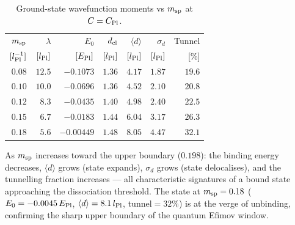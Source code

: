 \begin{table}[h]
\centering
\caption{Ground-state wavefunction moments vs $m_{\rm sp}$ at $C=C_{\rm Pl}$.}
\label{tab:psi0_vs_msp_moments}
\begin{tabular}{rrrrrrr}
\hline
$m_{\rm sp}$ & $\lambda$ & $E_0$ & $d_{\rm cl}$ & $\langle d\rangle$ &
$\sigma_d$ & Tunnel \\
$[l_{\rm Pl}^{-1}]$ & $[l_{\rm Pl}]$ & $[E_{\rm Pl}]$ & $[l_{\rm Pl}]$ &
$[l_{\rm Pl}]$ & $[l_{\rm Pl}]$ & [\%] \\
\hline
$0.08$ & $12.5$ & $-0.1073$ & $1.36$ & $4.17$ & $1.87$ & $19.6$ \\
$0.10$ & $10.0$ & $-0.0696$ & $1.36$ & $4.52$ & $2.10$ & $20.8$ \\
$0.12$ & $\;\;8.3$ & $-0.0435$ & $1.40$ & $4.98$ & $2.40$ & $22.5$ \\
$0.15$ & $\;\;6.7$ & $-0.0183$ & $1.44$ & $6.04$ & $3.17$ & $26.3$ \\
$0.18$ & $\;\;5.6$ & $-0.00449$ & $1.48$ & $8.05$ & $4.47$ & $32.1$ \\
\hline
\end{tabular}
\end{table}

\noindent
As $m_{\rm sp}$ increases toward the upper boundary ($0.198$):
the binding energy decreases, $\langle d\rangle$ grows (state
expands), $\sigma_d$ grows (state delocalises), and the
tunnelling fraction increases — all characteristic signatures of
a bound state approaching the dissociation threshold.
The state at $m_{\rm sp}=0.18$ ($E_0=-0.0045\,E_{\rm Pl}$,
$\langle d\rangle=8.1\,l_{\rm Pl}$, tunnel$=32\%$) is at
the verge of unbinding, confirming the sharp upper boundary
of the quantum Efimov window.
